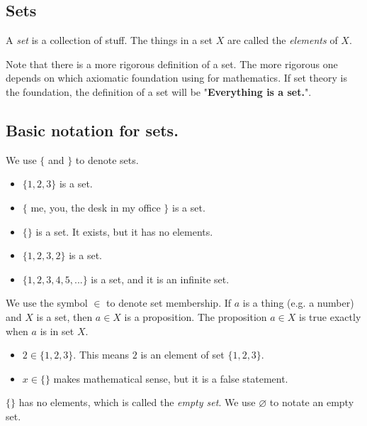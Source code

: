 \documentclass[a4paper]{article}
\begin{document}
\subsection{Sets}
\begin{defi}[Set]
	A \emph{set} is a collection of stuff. The things in a set $X$ are called the \emph{elements} of $X$.
\end{defi}
Note that there is a more rigorous definition of a set. The more rigorous one depends on which axiomatic foundation using for mathematics. If set theory is the foundation, the definition of a set will be "\textbf{Everything is a set.}".

\subsection{Basic notation for sets.}

\begin{notation}
We use $\{$ and $\}$ to denote sets.
\end{notation}

\begin{eg}\leavevmode
	\begin{itemize}
		\item $\{1, 2, 3\}$ is a set.
		\item $\{$ me, you, the desk in my office $\}$ is a set.
		\item $\{\}$ is a set. It exists, but it has no elements.
		\item $\{1, 2, 3, 2\}$ is a set.
		\item $\{1, 2, 3, 4, 5, ...\}$ is a set, and it is an infinite set.
	\end{itemize}
\end{eg}

We use the symbol $\in$ to denote set membership. If $a$ is a thing (e.g. a number) and $X$ is a set, then $a \in X$ is a proposition. The proposition $a \in X$ is true exactly when $a$ is in set $X$.

\begin{eg}\leavevmode
	\begin{itemize}
		\item $2 \in \{ 1, 2, 3 \}$. This means $2$ is an element of set $\{ 1, 2, 3 \}$.
		\item $x \in \{ \}$ makes mathematical sense, but it is a false statement.
	\end{itemize}
\end{eg}

\begin{notation}
$\{ \}$ has no elements, which is called the \emph{empty set}. We use $\varnothing$ to notate an empty set.
\end{notation}
\end{document}
